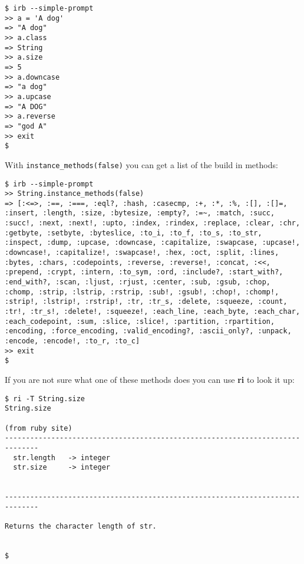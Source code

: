 \documentclass[a4paper]{book}
\begin{document}
\begin{shaded}\begin{verbatim}
$ irb --simple-prompt
>> a = 'A dog'
=> "A dog"
>> a.class
=> String
>> a.size
=> 5
>> a.downcase
=> "a dog"
>> a.upcase
=> "A DOG"
>> a.reverse
=> "god A"
>> exit
$
\end{verbatim}\end{shaded}

With \texttt{instance\_methods(false)} you can get a list of the build in methods:

\begin{shaded}\begin{verbatim}
$ irb --simple-prompt
>> String.instance_methods(false)
=> [:<=>, :==, :===, :eql?, :hash, :casecmp, :+, :*, :%, :[], :[]=, :insert, :length, :size, :bytesize, :empty?, :=~, :match, :succ, :succ!, :next, :next!, :upto, :index, :rindex, :replace, :clear, :chr, :getbyte, :setbyte, :byteslice, :to_i, :to_f, :to_s, :to_str, :inspect, :dump, :upcase, :downcase, :capitalize, :swapcase, :upcase!, :downcase!, :capitalize!, :swapcase!, :hex, :oct, :split, :lines, :bytes, :chars, :codepoints, :reverse, :reverse!, :concat, :<<, :prepend, :crypt, :intern, :to_sym, :ord, :include?, :start_with?, :end_with?, :scan, :ljust, :rjust, :center, :sub, :gsub, :chop, :chomp, :strip, :lstrip, :rstrip, :sub!, :gsub!, :chop!, :chomp!, :strip!, :lstrip!, :rstrip!, :tr, :tr_s, :delete, :squeeze, :count, :tr!, :tr_s!, :delete!, :squeeze!, :each_line, :each_byte, :each_char, :each_codepoint, :sum, :slice, :slice!, :partition, :rpartition, :encoding, :force_encoding, :valid_encoding?, :ascii_only?, :unpack, :encode, :encode!, :to_r, :to_c]
>> exit
$
\end{verbatim}\end{shaded}

If you are not sure what one of these methods does you can use \textbf{ri} to look it up:

\begin{shaded}\begin{verbatim}
$ ri -T String.size
String.size

(from ruby site)
------------------------------------------------------------------------------
  str.length   -> integer
  str.size     -> integer


------------------------------------------------------------------------------

Returns the character length of str.


$
\end{verbatim}\end{shaded}
\end{document}
